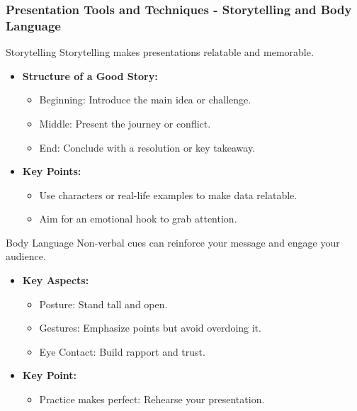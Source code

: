 \documentclass[aspectratio=169]{beamer}
\begin{document}
\begin{frame}[fragile]
    \frametitle{Presentation Tools and Techniques - Storytelling and Body Language}
    \begin{block}{Storytelling}
        Storytelling makes presentations relatable and memorable.
        \begin{itemize}
            \item \textbf{Structure of a Good Story:}
            \begin{itemize}
                \item Beginning: Introduce the main idea or challenge.
                \item Middle: Present the journey or conflict.
                \item End: Conclude with a resolution or key takeaway.
            \end{itemize}
            \item \textbf{Key Points:}
            \begin{itemize}
                \item Use characters or real-life examples to make data relatable.
                \item Aim for an emotional hook to grab attention.
            \end{itemize}
        \end{itemize}
    \end{block}
    
    \begin{block}{Body Language}
        Non-verbal cues can reinforce your message and engage your audience.
        \begin{itemize}
            \item \textbf{Key Aspects:}
            \begin{itemize}
                \item Posture: Stand tall and open.
                \item Gestures: Emphasize points but avoid overdoing it.
                \item Eye Contact: Build rapport and trust.
            \end{itemize}
            \item \textbf{Key Point:}
            \begin{itemize}
                \item Practice makes perfect: Rehearse your presentation.
            \end{itemize}
        \end{itemize}
    \end{block}
\end{frame}
\end{document}
